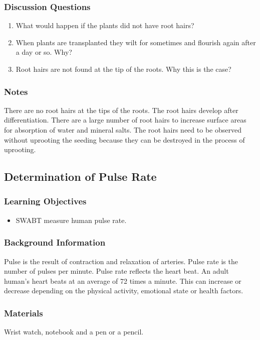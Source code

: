 \subsubsection*{Discussion Questions}
\begin{enumerate}
\item{What would happen if the plants did not have root hairs?}
\item{When plants are transplanted they wilt for sometimes and flourish again after a day or so. Why?}
\item{Root hairs are not found at the tip of the roots. Why this is the case?}
\end{enumerate}

\subsubsection*{Notes}
There are no root hairs at the tips of the roots. The root hairs develop after differentiation. There are a large number of root hairs to increase surface areas for absorption of water and mineral salts. The root hairs need to be observed without uprooting the seeding because they can be destroyed in the process of uprooting.


\subsection{Determination of Pulse Rate}

\subsubsection*{Learning Objectives}
\begin{itemize}
\item{SWABT measure human pulse rate.}
\end{itemize}

\subsubsection*{Background Information}
Pulse is the result of contraction and relaxation of arteries. Pulse rate is the number of pulses per minute. Pulse rate reflects the heart beat. An adult human's heart beats at an average of 72 times a minute. This can increase or decrease depending on the physical activity, emotional state or health factors.

\subsubsection*{Materials}
Wrist watch, notebook and a pen or a pencil.

